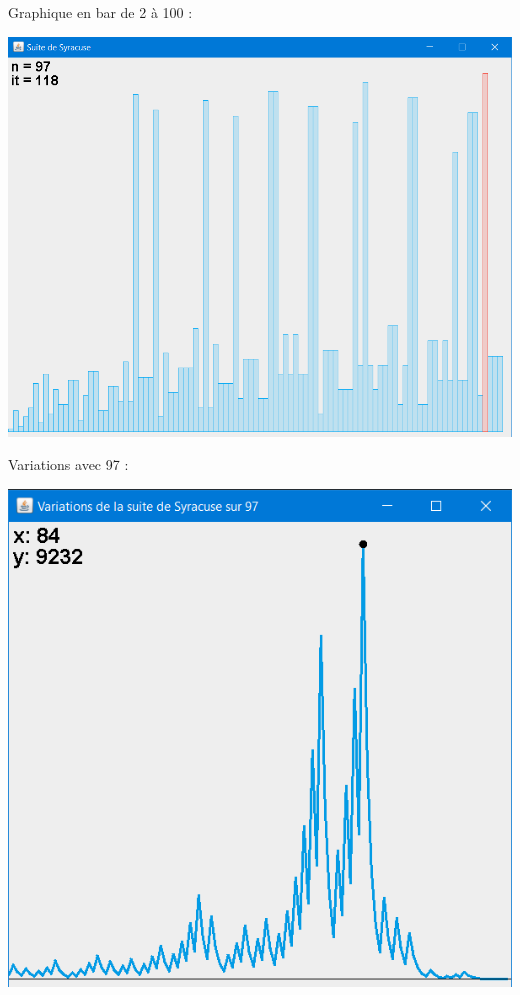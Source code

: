 \documentclass{beamer}
\begin{document}
\begin{frame}
Graphique en bar de 2 à 100 :
\begin{center}
\includegraphics[scale=0.45]{images/syracuse_100.PNG}
\end{center}
\end{frame}

\begin{frame}
Variations avec 97 :
\begin{center}
\includegraphics[scale=0.55]{images/syracuse_var_97.PNG}
\end{center}
\end{frame}
\end{document}
